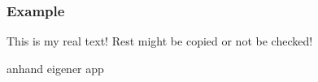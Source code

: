 \subsubsection{Example}\label{subsection:license-amazon-example}
This is my real text! Rest might be copied or not be checked!

anhand eigener app
